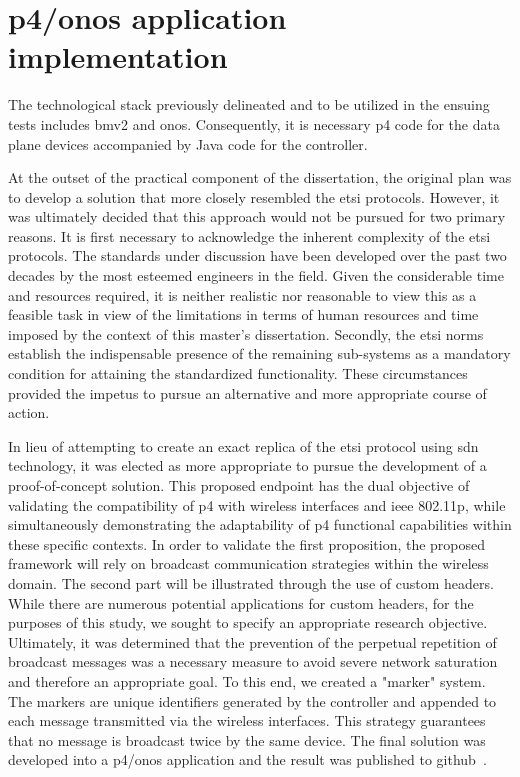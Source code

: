 \section[P4/ONOS application implementation]{\gls{p4}/\gls{onos} application implementation}
\label{sec:code}

The technological stack previously delineated and to be utilized in the ensuing tests includes \gls{bmv2} and \gls{onos}. Consequently, it is necessary p4 code for the data plane devices accompanied by Java code for the controller. 

At the outset of the practical component of the dissertation, the original plan was to develop a solution that more closely resembled the \gls{etsi} protocols. However, it was ultimately decided that this approach would not be pursued for two primary reasons. It is first necessary to acknowledge the inherent complexity of the \gls{etsi} protocols. The standards under discussion have been developed over the past two decades by the most esteemed engineers in the field. Given the considerable time and resources required, it is neither realistic nor reasonable to view this as a feasible task in view of the limitations in terms of human resources and time imposed by the context of this master's dissertation. Secondly, the \gls{etsi} norms establish the indispensable presence of the remaining sub-systems as a mandatory condition for attaining the standardized functionality. These circumstances provided the impetus to pursue an alternative and more appropriate course of action. 

In lieu of attempting to create an exact replica of the \gls{etsi} protocol using \gls{sdn} technology, it was elected as more appropriate to pursue the development of a proof-of-concept solution. This proposed endpoint has the dual objective of validating the compatibility of \gls{p4} with wireless interfaces and \gls{ieee} 802.11p, while simultaneously demonstrating the adaptability of \gls{p4} functional capabilities within these specific contexts.
In order to validate the first proposition, the proposed framework will rely on broadcast communication strategies within the wireless domain. The second part will be illustrated through the use of custom headers. While there are numerous potential applications for custom headers, for the purposes of this study, we sought to specify an appropriate research objective. Ultimately, it was determined that the prevention of the perpetual repetition of broadcast messages was a necessary measure to avoid severe network saturation and therefore an appropriate goal. To this end, we created a "marker" system. The markers are unique identifiers generated by the controller and appended to each message transmitted via the wireless interfaces. This strategy guarantees that no message is broadcast twice by the same device. The final solution was developed into a \gls{p4}/\gls{onos} application and the result was published to github~\cite{noauthor_baco-66onos-apps_nodate}.

